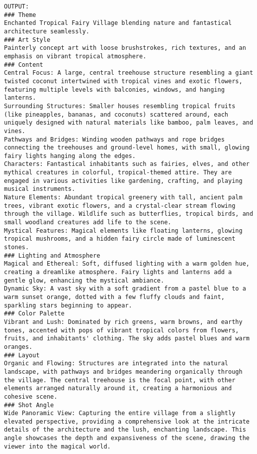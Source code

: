 \begin{lstlisting}
OUTPUT:
### Theme
Enchanted Tropical Fairy Village blending nature and fantastical architecture seamlessly.
### Art Style
Painterly concept art with loose brushstrokes, rich textures, and an emphasis on vibrant tropical atmosphere.
### Content
Central Focus: A large, central treehouse structure resembling a giant twisted coconut intertwined with tropical vines and exotic flowers, featuring multiple levels with balconies, windows, and hanging lanterns.
Surrounding Structures: Smaller houses resembling tropical fruits (like pineapples, bananas, and coconuts) scattered around, each uniquely designed with natural materials like bamboo, palm leaves, and vines.
Pathways and Bridges: Winding wooden pathways and rope bridges connecting the treehouses and ground-level homes, with small, glowing fairy lights hanging along the edges.
Characters: Fantastical inhabitants such as fairies, elves, and other mythical creatures in colorful, tropical-themed attire. They are engaged in various activities like gardening, crafting, and playing musical instruments.
Nature Elements: Abundant tropical greenery with tall, ancient palm trees, vibrant exotic flowers, and a crystal-clear stream flowing through the village. Wildlife such as butterflies, tropical birds, and small woodland creatures add life to the scene.
Mystical Features: Magical elements like floating lanterns, glowing tropical mushrooms, and a hidden fairy circle made of luminescent stones.
### Lighting and Atmosphere
Magical and Ethereal: Soft, diffused lighting with a warm golden hue, creating a dreamlike atmosphere. Fairy lights and lanterns add a gentle glow, enhancing the mystical ambiance.
Dynamic Sky: A vast sky with a soft gradient from a pastel blue to a warm sunset orange, dotted with a few fluffy clouds and faint, sparkling stars beginning to appear.
### Color Palette
Vibrant and Lush: Dominated by rich greens, warm browns, and earthy tones, accented with pops of vibrant tropical colors from flowers, fruits, and inhabitants' clothing. The sky adds pastel blues and warm oranges.
### Layout
Organic and Flowing: Structures are integrated into the natural landscape, with pathways and bridges meandering organically through the village. The central treehouse is the focal point, with other elements arranged naturally around it, creating a harmonious and cohesive scene.
### Shot Angle
Wide Panoramic View: Capturing the entire village from a slightly elevated perspective, providing a comprehensive look at the intricate details of the architecture and the lush, enchanting landscape. This angle showcases the depth and expansiveness of the scene, drawing the viewer into the magical world.


\end{lstlisting}